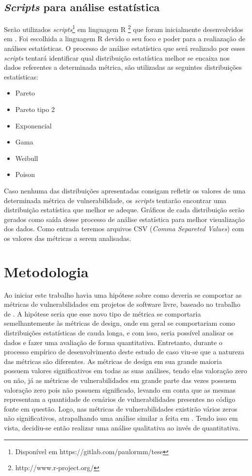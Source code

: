 \subsection{\textit{Scripts} para análise estatística} \label{scripts}

Serão utilizados \textit{scripts}\footnote{Disponível em https://gitlab.com/paulormm/tese} em linguagem R
\footnote{http://www.r-project.org/} que foram inicialmente desenvolvidos em \cite{meirelles2013}. Foi escolhida a linguagem R
devido o seu foco e poder para a realiazação de análises estatísticas. O processo de análise estatística que será realizado
por esses \textit{scripts} tentará identificar qual distribuição estatística melhor se encaixa nos dados referentes a 
determinada métrica, são utilizadas as seguintes distribuições estatísticas:

\begin{itemize}
  \item Pareto
  \item Pareto tipo 2
  \item Exponencial
  \item Gama
  \item Weibull
  \item Poison
\end{itemize}

Caso nenhuma das distribuições apresentadas consigam refletir os valores de uma determinada métrica de vulnerabilidade, os
\textit{scripts} tentarão encontrar uma distribuição estatística que melhor se adeque. Gráficos de cada distribuição serão
gerados como saída desse processo de análise estatística para melhor visualização dos dados. Como entrada teremos arquivos
CSV (\textit{Comma Separeted Values}) com os valores das métricas a serem analisadas.

\section{Metodologia} \label{metod_estudo}

Ao iniciar este trabalho havia uma hipótese sobre como deveria se comportar as métricas de vulnerabilidades em projetos de
software livre, baseado no trabalho de \cite{meirelles2013}. A hipótese seria que esse novo tipo de métrica se comportaria
semelhantemente às métricas de design, onde em geral se comportariam como distribuições estatísticas de cauda longa, e com
isso, seria possível analisar os dados e fazer uma avaliação de forma quantitativa. Entretanto, durante o processo empírico
de desenvolvimento deste estudo de caso viu-se que a natureza das métricas são diferentes. As métricas de design em sua grande
maioria possuem valores significativos em todas as suas análises, tendo elas valoração zero ou não, já as métricas de 
vulnerabilidades em grande parte das vezes possuem valoração zero pois não possuem significado, levando em conta que as mesmas
representam a quantidade de cenários de vulnerabilidades presentes no código fonte em questão. Logo, nas métricas de 
vulnerabilidades existirão vários zeros não significativos, atrapalhando uma análise similar a feita em \cite{meirelles2013}.
Tendo isso em vista, decidiu-se então realizar uma análise qualitativa ao invés de quantitativa.

